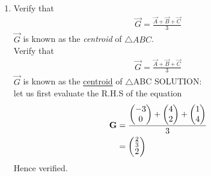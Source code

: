 \documentclass[11pt]{book}
\begin{document}
\begin{enumerate}[label=\thesection.\arabic*.,ref=\thesection.\theenumi]
\item Verify that 
		\begin{align}
			\vec{G}=\frac{\vec{A}+\vec{B}+\vec{C}}{3}
		\end{align}
$\vec{G}$ is known as the {\em centroid} of $\triangle ABC$.\\
Verify that\\
\begin{align}
 \vec{G}=\frac{\vec{A}+\vec{B}+\vec{C}}{3}   
\end{align}
$\vec{G}$ is known as the \underline{centroid} of $\triangle$ABC 
SOLUTION:\\
let us first evaluate the R.H.S of the equation
\begin{equation}
\begin{split}
\label{eq:centroid}
    \vec{G}&= \frac{\myvec{-3\\0}+\myvec{4\\2}+\myvec{1\\4}}{3}\\   
     &= \myvec{\frac{2}{3}\\ 2}
\end{split}
\end{equation}
Hence verified.



\end{enumerate}
\end{document}
